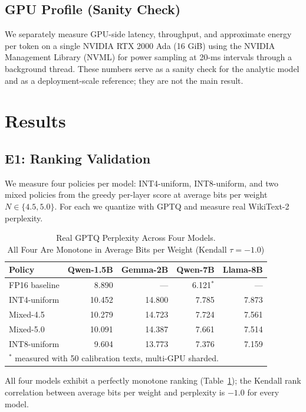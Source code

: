 \documentclass{ieeeaccess}
\begin{document}
\subsection{GPU Profile (Sanity Check)}
We separately measure GPU-side latency, throughput, and approximate
energy per token on a single NVIDIA RTX 2000 Ada (16 GiB) using the
NVIDIA Management Library (NVML) for power sampling at 20-ms intervals
through a background thread. These numbers serve as a sanity check for
the analytic model and as a deployment-scale reference; they are not
the main result.

\section{Results}
\label{sec:results}

\subsection{E1: Ranking Validation}
\label{sec:e1}
We measure four policies per model: INT4-uniform, INT8-uniform, and
two mixed policies from the greedy per-layer score at average bits per
weight $N \in \{4.5, 5.0\}$. For each we quantize with GPTQ and measure
real WikiText-2 perplexity.

\begin{table}[t]
\caption{Real GPTQ Perplexity Across Four Models.\\ All Four Are Monotone in Average Bits per Weight (Kendall $\tau = -1.0$)}
\label{tab:e1}
\centering
\begin{tabular}{lrrrr}
\toprule
Policy & Qwen-1.5B & Gemma-2B & Qwen-7B & Llama-8B \\
\midrule
FP16 baseline & 8.890  & ---     & 6.121$^*$ & ---     \\
INT4-uniform  & 10.452 & 14.800  & 7.785     & 7.873   \\
Mixed-4.5     & 10.279 & 14.723  & 7.724     & 7.561   \\
Mixed-5.0     & 10.091 & 14.387  & 7.661     & 7.514   \\
INT8-uniform  & 9.604  & 13.773  & 7.376     & 7.159   \\
\bottomrule
\multicolumn{5}{l}{\footnotesize $^*$ measured with 50 calibration
texts, multi-GPU sharded.}
\end{tabular}
\end{table}

All four models exhibit a perfectly monotone ranking (Table~\ref{tab:e1});
the Kendall rank correlation between average bits per weight and
perplexity is $-1.0$ for every model.
\end{document}
